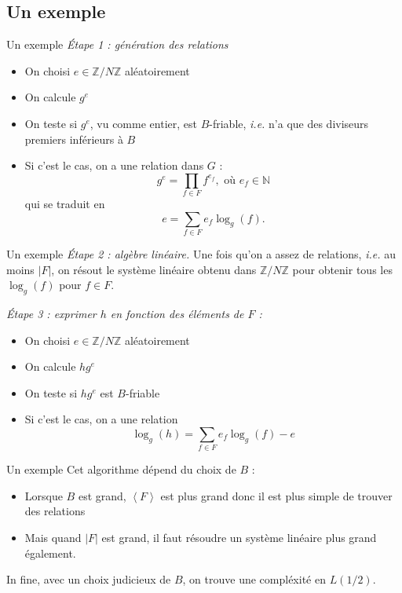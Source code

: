 \documentclass[xcolor=x11names,compress]{beamer}
\theoremstyle{break}
\theoremstyle{sc}
\theoremstyle{definition}
\theoremstyle{remark}
\newcommand{\ie}{\emph{i.e. }}
\begin{document}
\subsection{Un exemple}
\begin{frame}{Un exemple}
  \emph{Étape 1 : génération des relations}
  \begin{itemize}
    \item On choisi $e\in \mathbb{Z}/N\mathbb{Z}$ aléatoirement
    \item On calcule $g^e$
    \item On teste si $g^e$, vu comme entier, est $B$-friable, \ie n'a que des
      diviseurs premiers inférieurs à $B$
    \item Si c'est le cas, on a une relation dans $G$ :
      \[ 
        g^e = \prod_{f\in F}f^{e_f}, \text{ où } e_f\in \mathbb{N}
      \]
      qui se traduit en 
      \[
        e = \sum_{f\in F}e_f\log_g(f).
      \]
  \end{itemize}
\end{frame}

\begin{frame}{Un exemple}
  \emph{Étape 2 : algèbre linéaire.} Une fois qu'on a assez de relations, \ie au
  moins $|F|$, on résout le système linéaire obtenu dans
  $\mathbb{Z}/N\mathbb{Z}$ pour obtenir tous les $\log_g(f)$ pour $f\in F$.

  \emph{Étape 3 : exprimer $h$ en fonction des éléments de $F$ :}
  \begin{itemize}
    \item On choisi $e\in \mathbb{Z}/N\mathbb{Z}$ aléatoirement
    \item On calcule $hg^e$
    \item On teste si $hg^e$ est $B$-friable
    \item Si c'est le cas, on a une relation
      \[
      \log_g(h) = \sum_{f\in F}e_f\log_g(f) - e
      \]
  \end{itemize}

\end{frame}

\begin{frame}{Un exemple}
  Cet algorithme dépend du choix de $B$ :
  \begin{itemize}
    \item Lorsque $B$ est grand, $\left\langle F \right\rangle$ est plus grand
      donc il est plus simple de trouver des relations
    \item Mais quand $|F|$ est grand, il faut résoudre un système linéaire plus
      grand également.
  \end{itemize}
  In fine, avec un choix judicieux de $B$, on trouve une compléxité en
  $L(1/2)$.
\end{frame}
\end{document}
